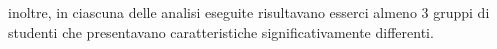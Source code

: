 \documentclass[12pt]{article}
\begin{document}
inoltre, in ciascuna delle analisi eseguite risultavano esserci almeno 3 gruppi di studenti che presentavano 
caratteristiche significativamente differenti.

\newpage 

\listoffigures
 
\newpage


\listoftables

\newpage

\end{document}
